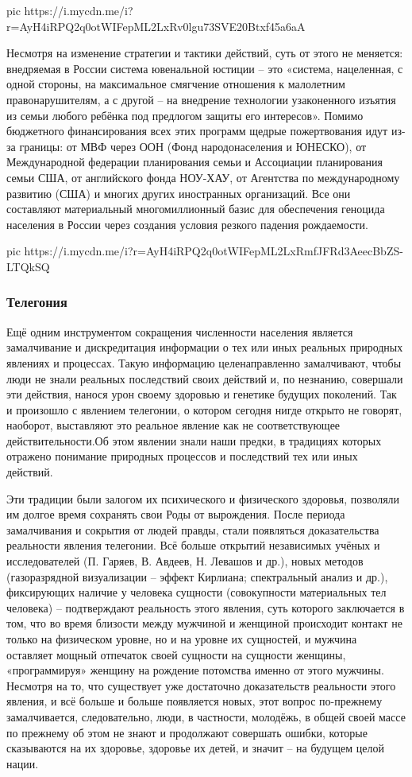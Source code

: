 \ifcmt
pic https://i.mycdn.me/i?r=AyH4iRPQ2q0otWIFepML2LxRv0lgu73SVE20Btxf45a6aA
\fi

Несмотря на изменение стратегии и тактики действий, суть от этого не меняется:
внедряемая в России система ювенальной юстиции – это «система, нацеленная, с
одной стороны, на максимальное смягчение отношения к малолетним
правонарушителям, а с другой – на внедрение технологии узаконенного изъятия из
семьи любого ребёнка под предлогом защиты его интересов». Помимо бюджетного
финансирования всех этих программ щедрые пожертвования идут из-за границы: от
МВФ через ООН (Фонд народонаселения и ЮНЕСКО), от Международной федерации
планирования семьи и Ассоциации планирования семьи США, от английского фонда
НОУ-ХАУ, от Агентства по международному развитию (США) и многих других
иностранных организаций. Все они составляют материальный многомиллионный базис
для обеспечения геноцида населения в России через создания условия резкого
падения рождаемости. 

\ifcmt
pic https://i.mycdn.me/i?r=AyH4iRPQ2q0otWIFepML2LxRmfJFRd3AeecBbZS-LTQkSQ
\fi

\subsubsection{Телегония}

Ещё одним инструментом сокращения численности населения является замалчивание и
дискредитация информации о тех или иных реальных природных явлениях и
процессах. Такую информацию целенаправленно замалчивают, чтобы люди не знали
реальных последствий своих действий и, по незнанию, совершали эти действия,
нанося урон своему здоровью и генетике будущих поколений. Так и произошло с
явлением телегонии, о котором сегодня нигде открыто не говорят, наоборот,
выставляют это реальное явление как не соответствующее действительности.Об этом
явлении знали наши предки, в традициях которых отражено понимание природных
процессов и последствий тех или иных действий. 

Эти традиции были залогом их психического и физического здоровья, позволяли им
долгое время сохранять свои Роды от вырождения. После периода замалчивания и
сокрытия от людей правды, стали появляться доказательства реальности явления
телегонии. Всё больше открытий независимых учёных и исследователей (П. Гаряев,
В. Авдеев, Н. Левашов и др.), новых методов (газоразрядной визуализации –
эффект Кирлиана; спектральный анализ и др.), фиксирующих наличие у человека
сущности (совокупности материальных тел человека) – подтверждают реальность
этого явления, суть которого заключается в том, что во время близости между
мужчиной и женщиной происходит контакт не только на физическом уровне, но и на
уровне их сущностей, и мужчина оставляет мощный отпечаток своей сущности на
сущности женщины, «программируя» женщину на рождение потомства именно от этого
мужчины. Несмотря на то, что существует уже достаточно доказательств реальности
этого явления, и всё больше и больше появляется новых, этот вопрос по-прежнему
замалчивается, следовательно, люди, в частности, молодёжь, в общей своей массе
по прежнему об этом не знают и продолжают совершать ошибки, которые сказываются
на их здоровье, здоровье их детей, и значит – на будущем целой нации.

